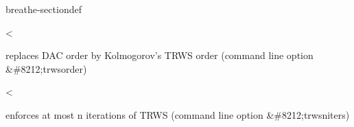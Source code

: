 \documentclass[letterpaper,10pt,openany,oneside,english]{sphinxmanual}
\begin{document}
\begin{fulllineitems}
\begin{sphinxuseclass}{breathe-sectiondef}
\begin{fulllineitems}
\label{\detokenize{ref/ref_cpp:_CPPv4N8ToulBar29trwsNIterE}}\label{\detokenize{ref/ref_cpp:_CPPv3N8ToulBar29trwsNIterE}}\label{\detokenize{ref/ref_cpp:_CPPv2N8ToulBar29trwsNIterE}}\label{\detokenize{ref/ref_cpp:ToulBar2::trwsNIter__unsigned-i}}
\pysigstartsignatures
\pysigstartmultiline
{}
\pysigstopmultiline
\pysigstopsignatures
\sphinxAtStartPar
\textless{} 

\sphinxAtStartPar
replaces DAC order by Kolmogorov’s TRW\sphinxhyphen{}S order (command line option \&\#8212;trws\sphinxhyphen{}order) 

\end{fulllineitems}


\begin{fulllineitems}
\label{\detokenize{ref/ref_cpp:_CPPv4N8ToulBar217trwsNIterNoChangeE}}\label{\detokenize{ref/ref_cpp:_CPPv3N8ToulBar217trwsNIterNoChangeE}}\label{\detokenize{ref/ref_cpp:_CPPv2N8ToulBar217trwsNIterNoChangeE}}\label{\detokenize{ref/ref_cpp:ToulBar2::trwsNIterNoChange__unsigned-i}}
\pysigstartsignatures
\pysigstartmultiline
{}
\pysigstopmultiline
\pysigstopsignatures
\sphinxAtStartPar
\textless{} 

\sphinxAtStartPar
enforces at most n iterations of TRW\sphinxhyphen{}S (command line option \&\#8212;trws\sphinxhyphen{}n\sphinxhyphen{}iters) 

\end{fulllineitems}



\end{sphinxuseclass}
\end{fulllineitems}
\end{document}
